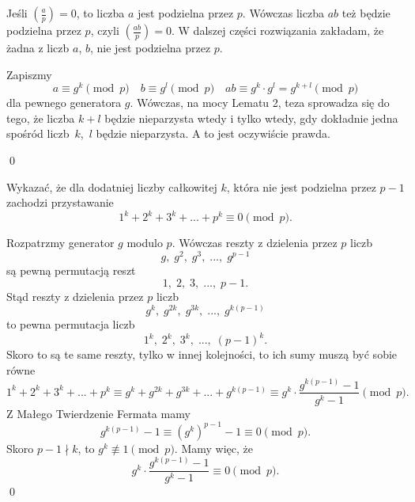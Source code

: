 
\noindent
Jeśli $\left(\frac{a}{p}\right) = 0$, to liczba $a$ jest podzielna przez $p$. Wówczas liczba $ab$ też będzie podzielna przez $p$, czyli $\left(\frac{ab}{p}\right) = 0$. W dalszej części rozwiązania zakładam, że żadna z liczb $a$, $b$, nie jest podzielna przez $p$.

\noindent
Zapiszmy
\[
	a \equiv g^k \pmod{p} \quad b \equiv g^l \pmod{p} \quad ab \equiv g^k \cdot g^l = g^{k + l} \pmod{p}
\]
dla pewnego generatora $g$. Wówczas, na mocy Lematu 2, teza sprowadza się do tego, że liczba $k + l$ będzie nieparzysta wtedy i tylko wtedy, gdy dokładnie jedna spośród liczb~$k$,~$l$ będzie nieparzysta. A to jest oczywiście prawda.

\qed

\vspace{10px}


\noindent
Wykazać, że dla dodatniej liczby całkowitej $k$, która nie jest podzielna przez $p - 1$ zachodzi przystawanie
\[
	1^k + 2^k + 3^k + ... + p^k \equiv 0 \pmod{p}.
\]

\vspace{10px}


\noindent
Rozpatrzmy generator $g$ modulo $p$. Wówczas reszty z dzielenia przez $p$ liczb
\[
	g,\; g^2,\; g^3,\; ...,\; g^{p - 1}
\]
są pewną permutacją reszt
\[
	1,\; 2,\; 3,\; ...,\;  p - 1.
\]
Stąd reszty z dzielenia przez $p$ liczb
\[
	g^k,\; g^{2k},\; g^{3k},\; ...,\; g^{k(p - 1)}
\]
to pewna permutacja liczb
\[
	1^k,\; 2^k,\; 3^k,\; ...,\;  (p - 1)^k.
\]
Skoro to są te same reszty, tylko w innej kolejności, to ich sumy muszą być sobie równe
\[
	1^k + 2^k + 3^k + ... + p^k \equiv g^k + g^{2k} + g^{3k} +  ... + g^{k(p - 1)} \equiv g^k \cdot \frac{g^{k(p - 1)} - 1}{g^k - 1} \pmod{p}.
\]
Z Małego Twierdzenie Fermata mamy
\[
	g^{k(p - 1)} - 1 \equiv \left(g^{k}\right)^{p - 1} - 1 \equiv 0 \pmod{p}. 
\]
Skoro $p - 1 \nmid k$, to $g^k \not\equiv 1 \pmod{p}$. Mamy więc, że
\[
	g^k \cdot \frac{g^{k(p - 1)} - 1}{g^k - 1} \equiv 0 \pmod{p}.
\]
\qed
